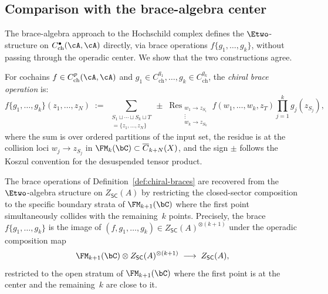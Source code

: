 \subsection{Comparison with the brace-algebra center}
\label{subsec:center-comparison}

The brace-algebra approach to the Hochschild complex defines the
$\Etwo$-structure on $C^{\bullet}_{\mathrm{ch}}(\cA, \cA)$ directly,
via brace operations $f\{g_1, \ldots, g_k\}$, without passing through
the operadic center. We show that the two constructions agree.

\begin{definition}
\label{def:chiral-braces}
For cochains
$f \in C^p_{\mathrm{ch}}(\cA, \cA)$ and
$g_1 \in C^{q_1}_{\mathrm{ch}}, \ldots, g_k \in C^{q_k}_{\mathrm{ch}}$,
the \emph{chiral brace operation} is:
\begin{equation}\label{eq:chiral-brace}
f\{g_1, \ldots, g_k\}(z_1, \ldots, z_N)
\;:=\;
\sum_{\substack{S_1 \sqcup \cdots \sqcup S_k \sqcup T \\
= \{z_1, \ldots, z_N\}}}
\pm\;
\operatorname{Res}_{\substack{w_1 \to z_{S_1} \\
\vdots \\ w_k \to z_{S_k}}}
f(w_1, \ldots, w_k, z_T)
\prod_{j=1}^{k} g_j(z_{S_j}),
\end{equation}
where the sum is over ordered partitions of the input set, the
residue is at the collision loci $w_j \to z_{S_j}$ in
$\FM_k(\bC) \subset \overline{C}_{k+N}(X)$, and the sign $\pm$
follows the Koszul convention for the desuspended tensor product.
\end{definition}

\begin{proposition}
\label{prop:braces-from-center}
The brace operations of
Definition~\textup{\ref{def:chiral-braces}} are recovered from the
$\Etwo$-algebra structure on $Z_{\mathsf{SC}}(A)$ by restricting
the closed-sector composition to the specific boundary strata of
$\FM_{k+1}(\bC)$ where the first point simultaneously collides with
the remaining~$k$ points. Precisely, the brace
$f\{g_1, \ldots, g_k\}$ is the image of
$(f, g_1, \ldots, g_k) \in Z_{\mathsf{SC}}(A)^{\otimes(k+1)}$
under the operadic composition map
\[
\FM_{k+1}(\bC)
\otimes
Z_{\mathsf{SC}}(A)^{\otimes(k+1)}
\;\longrightarrow\;
Z_{\mathsf{SC}}(A),
\]
restricted to the open stratum of $\FM_{k+1}(\bC)$ where the
first point is at the center and the remaining~$k$ are close
to it.
\end{proposition}

